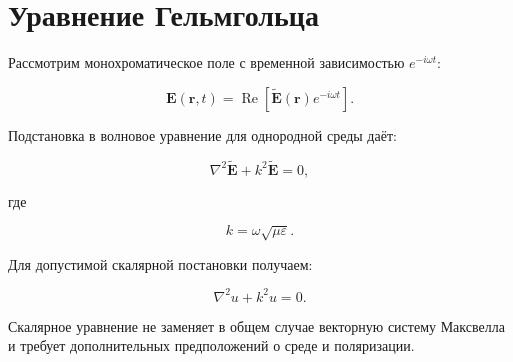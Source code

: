 \section{Уравнение Гельмгольца}
\label{sec:helmholtz}

Рассмотрим монохроматическое поле
с временной зависимостью
$e^{-i\omega t}$:

\begin{equation}
\mathbf{E}(\mathbf{r},t)
=
\operatorname{Re}
\left[
\widetilde{\mathbf{E}}(\mathbf{r})
e^{-i\omega t}
\right].
\end{equation}

Подстановка в волновое уравнение
для однородной среды даёт:

\begin{equation}
\nabla^2\widetilde{\mathbf{E}}
+
k^2\widetilde{\mathbf{E}}
=0,
\end{equation}

где

\begin{equation}
k=\omega\sqrt{\mu\varepsilon}.
\end{equation}

Для допустимой скалярной постановки
получаем:

\begin{equation}
\boxed{
\nabla^2 u+k^2u=0
}.
\end{equation}

Скалярное уравнение не заменяет
в общем случае векторную систему
Максвелла и требует дополнительных
предположений о среде и поляризации.
